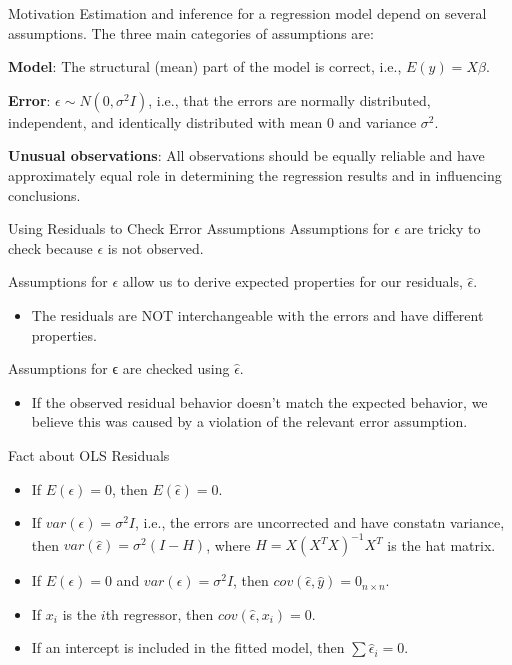 \begin{frame}
\end{frame}

\begin{frame}{Motivation}
\protect\hypertarget{motivation}{}
Estimation and inference for a regression model depend on several
assumptions. The three main categories of assumptions are:

\textbf{Model}: The structural (mean) part of the model is correct,
i.e., \(E(y)=X\beta\).

\textbf{Error}: \(\epsilon\sim N(0,\sigma^2 I)\), i.e., that the errors
are normally distributed, independent, and identically distributed with
mean 0 and variance \(\sigma^2\).

\textbf{Unusual observations}: All observations should be equally
reliable and have approximately equal role in determining the regression
results and in influencing conclusions.
\end{frame}

\begin{frame}{Using Residuals to Check Error Assumptions}
\protect\hypertarget{using-residuals-to-check-error-assumptions}{}
Assumptions for \(\epsilon\) are tricky to check because \(\epsilon\) is
not observed.

Assumptions for \(\epsilon\) allow us to derive expected properties for
our residuals, \(\hat{\epsilon}\).

\begin{itemize}
\tightlist
\item
  The residuals are NOT interchangeable with the errors and have
  different properties.
\end{itemize}

Assumptions for ϵ are checked using \(\hat{\epsilon}\).

\begin{itemize}
\tightlist
\item
  If the observed residual behavior doesn't match the expected behavior,
  we believe this was caused by a violation of the relevant error
  assumption.
\end{itemize}
\end{frame}

\begin{frame}{Fact about OLS Residuals}
\protect\hypertarget{fact-about-ols-residuals}{}
\begin{itemize}
\tightlist
\item
  If \(E(\epsilon)=0\), then \(E(\hat{\epsilon}) = 0.\)
\item
  If \(var(\epsilon)=\sigma^2 I\), i.e., the errors are uncorrected and
  have constatn variance, then \(var(\hat{\epsilon}) = \sigma^2(I-H)\),
  where \(H = X(X^TX)^{-1}X^T\) is the hat matrix.
\item
  If \(E(\epsilon)=0\) and \(var(\epsilon)=\sigma^2I\), then
  \(cov(\hat{\epsilon}, \hat{y})=0_{n\times n}.\)
\item
  If \(x_i\) is the \(i\)th regressor, then
  \(cov(\hat{\epsilon}, x_i)=0\).
\item
  If an intercept is included in the fitted model, then
  \(\sum \hat{\epsilon}_i=0\).
\end{itemize}
\end{frame}

